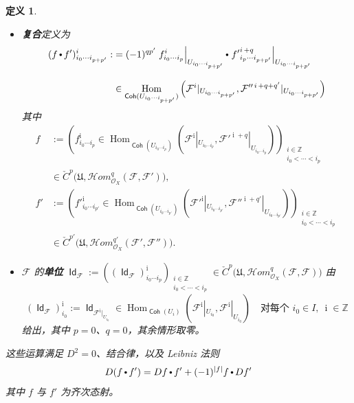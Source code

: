 \documentclass[11pt,a4paper]{article}
\renewcommand{\emph}[1]{{\bfseries #1}}
\DeclareMathOperator{\id}{\mathsf{Id}}
\DeclareMathOperator{\Coh}{\mathsf{Coh}}
\DeclareMathOperator{\Hom}{\operatorname{Hom}}
\DeclareMathOperator{\comp}{\vcenter{\hbox{\scalebox{0.65}{$\bullet$}}}}
\DeclareMathOperator{\objectdegree}{{\text{$i$}}}
\theoremstyle{cnth}
\newtheorem{dfn}[thm]{定义}
\begin{document}
\begin{dfn}
\begin{itemize}
\item
\emph{复合}定义为
\begin{align*}
(f\comp f')_{i_0\cdots i_{p+p'}}^{\objectdegree}
:&=
(-1)^{qp'}
\left.
f_{i_0\cdots i_p}^{\objectdegree}
\right|_{U_{i_0\cdots i_{p+p'}}}
\comp
\left.
{f'}_{i_p\cdots i_{p+p'}}^{\objectdegree+q}
\right|_{U_{i_0\cdots i_{p+p'}}}
\\[3mm]
&\in
\Hom_{\Coh(U_{i_0\cdots i_{p+p'}})}\left(\mathcal{F}^{\objectdegree}|_{U_{i_0\cdots i_{p+p'}}},\mathcal{F}''^{\objectdegree+q+q'}|_{U_{i_0\cdots i_{p+p'}}}\right)
\end{align*}
其中
\begin{align*}
f
&:=
\left(
f_{i_0\cdots i_p}^{\objectdegree}
\in
\Hom_{\Coh(U_{i_0\cdots i_p})}\left(\mathcal{F}^{\objectdegree}|_{U_{i_0\cdots i_p}},\mathcal{F}'^{\objectdegree+q}|_{U_{i_0\cdots i_p}}\right)
\right)_{
\substack{
i\in\mathbb{Z}
\\
i_0<\cdots<i_p
}
}
\\[2mm]
&\in
\check{C}^p\big(
\mathfrak{U},\mathcal{H}om_{\mathcal{O}_X}^q(\mathcal{F},\mathcal{F}')
\big),
\\[2mm]
f'
&:=
\left(
{f'}_{i_0\cdots i_{p'}}^{\objectdegree}
\in
\Hom_{\Coh(U_{i_0\cdots i_{p'}})}\left(\mathcal{F}'^{\objectdegree}|_{U_{i_0\cdots i_{p'}}},\mathcal{F}''^{\objectdegree+q'}|_{U_{i_0\cdots i_{p'}}}\right)
\right)_{
\substack{
i\in\mathbb{Z}
\\
i_0<\cdots<i_p
}
}
\\[2mm]
&\in
\check{C}^{p'}\big(
\mathfrak{U},\mathcal{H}om_{\mathcal{O}_X}^{q'}(\mathcal{F}',\mathcal{F}'')
\big).
\end{align*}

\item
$\mathcal{F}$ 的\emph{单位}
$
\id_{\mathcal{F}}
:=
\left(\left(\id_{\mathcal{F}}\right)_{i_0\cdots i_p}^{\objectdegree}\right)_{
\substack{
i\in\mathbb{Z}
\\
i_0<\cdots<i_p
}
}
\in
\check{C}^p\big(
\mathfrak{U},\mathcal{H}om_{\mathcal{O}_X}^q(\mathcal{F},\mathcal{F})
\big)
$
由
$$
\left(\id_{\mathcal{F}}\right)_{i_0}^{\objectdegree}
:=
\id_{\mathcal{F}^{\objectdegree}|_{U_{i_0}}}
\in
\Hom_{\Coh(U_{i})}\left(\mathcal{F}^{\objectdegree}|_{U_{i_0}},\mathcal{F}^{\objectdegree}|_{U_{i_0}}\right)
\quad\text{对每个 }
i_0\in I,\
\objectdegree\in\mathbb{Z}
$$
给出，其中 $p=0$、$q=0$，其余情形取零。
\end{itemize}

这些运算满足 $D^2=0$、结合律，以及 Leibniz 法则
$$
D(f\comp f')
=
Df\comp f'+(-1)^{|f|}f\comp Df'
$$
其中 $f$ 与 $f'$ 为齐次态射。
\end{dfn}
\end{document}

